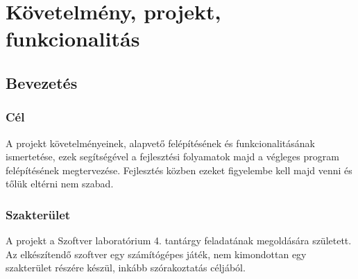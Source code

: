 %
\chapter{Követelmény, projekt, funkcionalitás}

\thispagestyle{fancy}

\section{Bevezetés}

\subsection{Cél}

A projekt követelményeinek, alapvető felépítésének és funkcionalitásának ismertetése, ezek segítségével a fejlesztési folyamatok majd a végleges program felépítésének megtervezése. Fejlesztés közben ezeket figyelembe kell majd venni és tőlük eltérni nem szabad.

\subsection{Szakterület}
A projekt a Szoftver laboratórium 4. tantárgy feladatának megoldására született. Az elkészítendő szoftver egy számítógépes játék, nem kimondottan egy szakterület részére készül, inkább szórakoztatás céljából.

